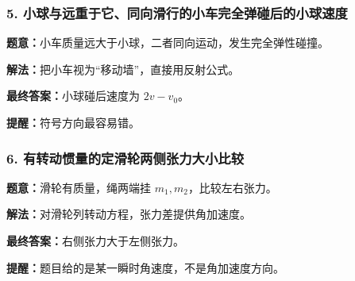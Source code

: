 \documentclass[12pt,a4paper]{ctexart}
\begin{document}
\subsubsection*{5. 小球与远重于它、同向滑行的小车完全弹碰后的小球速度}
\begin{tcolorbox}[colback=gray!2!white,colframe=black!60,title={题目}]
\textbf{题意：}小车质量远大于小球，二者同向运动，发生完全弹性碰撞。\par
\end{tcolorbox}
\begin{tcolorbox}[colback=blue!2!white,colframe=blue!55!black,title={完整答案}]
\textbf{解法：}把小车视为“移动墙”，直接用反射公式。\par
\textbf{最终答案：}小球碰后速度为 \(2v-v_0\)。\par

\end{tcolorbox}
\begin{tcolorbox}[colback=red!2!white,colframe=red!55!black,title={易错点}]
\textbf{提醒：}符号方向最容易错。\par
\end{tcolorbox}

\subsubsection*{6. 有转动惯量的定滑轮两侧张力大小比较}
\begin{tcolorbox}[colback=gray!2!white,colframe=black!60,title={题目}]
\textbf{题意：}滑轮有质量，绳两端挂 \(m_1,m_2\)，比较左右张力。\par
\end{tcolorbox}
\begin{tcolorbox}[colback=blue!2!white,colframe=blue!55!black,title={完整答案}]
\textbf{解法：}对滑轮列转动方程，张力差提供角加速度。\par
\textbf{最终答案：}右侧张力大于左侧张力。\par

\end{tcolorbox}
\begin{tcolorbox}[colback=red!2!white,colframe=red!55!black,title={易错点}]
\textbf{提醒：}题目给的是某一瞬时角速度，不是角加速度方向。\par
\end{tcolorbox}
\end{document}
